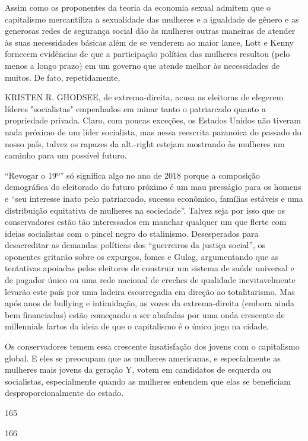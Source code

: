  \par 
Assim como os proponentes da teoria da economia sexual admitem que o capitalismo mercantiliza a sexualidade das mulheres e a igualdade de gênero e as generosas redes de segurança social dão às mulheres outras maneiras de atender às suas necessidades básicas além de se venderem ao maior lance, Lott e Kenny fornecem evidências de que a participação política das mulheres resultou (pelo menos a longo prazo) em um governo que atende melhor às necessidades de muitos. De fato, repetidamente,
 \par 
KRISTEN R. GHODSEE, de extrema-direita, acusa as eleitoras de elegerem líderes "socialistas" empenhados em minar tanto o patriarcado quanto a propriedade privada. Claro, com poucas exceções, os Estados Unidos não tiveram nada próximo de um líder socialista, mas nessa reescrita paranoica do passado do nosso país, talvez os rapazes da alt.-right estejam mostrando às mulheres um caminho para um possível futuro.
 \par 
“Revogar o 19º” só significa algo no ano de 2018 porque a composição demográfica do eleitorado do futuro próximo é um mau presságio para os homens e “seu interesse inato pelo patriarcado, sucesso econômico, famílias estáveis ​​e uma distribuição equitativa de mulheres na sociedade”. Talvez seja por isso que os conservadores estão tão interessados ​​em manchar qualquer um que flerte com ideias socialistas com o pincel negro do stalinismo. Desesperados para desacreditar as demandas políticas dos “guerreiros da justiça social”, os oponentes gritarão sobre os expurgos, fomes e Gulag, argumentando que as tentativas apoiadas pelos eleitores de construir um sistema de saúde universal e de pagador único ou uma rede nacional de creches de qualidade inevitavelmente levarão este país por uma ladeira escorregadia em direção ao totalitarismo. Mas após anos de bullying e intimidação, as vozes da extrema-direita (embora ainda bem financiadas) estão começando a ser abafadas por uma onda crescente de millennials fartos da ideia de que o capitalismo é o único jogo na cidade.
 \par 
Os conservadores temem essa crescente insatisfação dos jovens com o capitalismo global. E eles se preocupam que as mulheres americanas, e especialmente as mulheres mais jovens da geração Y, votem em candidatos de esquerda ou socialistas, especialmente quando as mulheres entendem que elas se beneficiam desproporcionalmente do estado.
 \par 
165
 \par 
166
